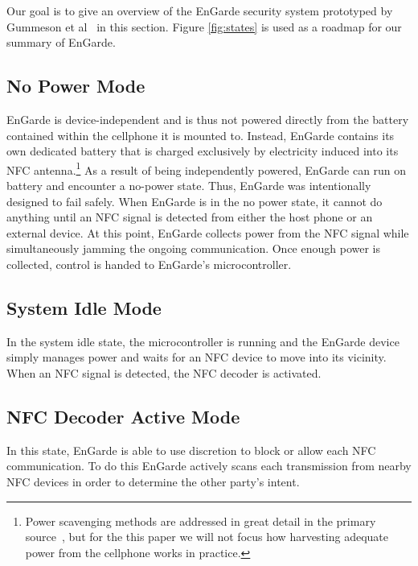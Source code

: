 \documentclass{sig-alternate}
\begin{document}
Our goal is to give an overview of the EnGarde security system prototyped by Gummeson et al~\cite{Gum2013} in this section. Figure \ref{fig:states} is used as a roadmap for our summary of EnGarde.

\subsection{No Power Mode}

EnGarde is device-independent and is thus not powered directly from the battery contained within the cellphone it is mounted to. Instead, EnGarde contains its own dedicated battery that is charged exclusively by electricity induced into its NFC antenna.\footnote{Power scavenging methods are addressed in great detail in the primary source~\cite{Gum2013}, but for the this paper we will not focus how harvesting adequate power from the cellphone works in practice.}
As a result of being independently powered, EnGarde can run on battery and encounter a no-power state. Thus, EnGarde was intentionally designed to fail safely. When EnGarde is in the no power state, it cannot do anything until an NFC signal is detected from either the host phone or an external device. At this point, EnGarde collects power from the NFC signal while simultaneously jamming the ongoing communication. Once enough power is collected, control is handed to EnGarde's microcontroller.

\subsection{System Idle Mode}
In the system idle state, the microcontroller is running and the EnGarde device simply manages power and waits for an NFC device to move into its vicinity. When an NFC signal is detected, the NFC decoder is activated.

\subsection{NFC Decoder Active Mode}
In this state, EnGarde is able to use discretion to block or allow each NFC communication. To do this EnGarde actively scans each transmission from nearby NFC devices in order to determine the other party's intent.
\end{document}
